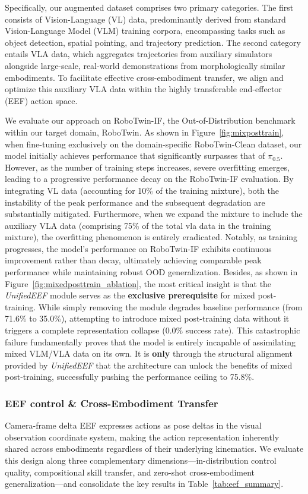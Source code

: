 Specifically, our augmented dataset comprises two primary categories. The first consists of Vision-Language (VL) data, predominantly derived from standard Vision-Language Model (VLM) training corpora, encompassing tasks such as object detection, spatial pointing, and trajectory prediction. The second category entails VLA data, which aggregates trajectories from auxiliary simulators alongside large-scale, real-world demonstrations from morphologically similar embodiments. To facilitate effective cross-embodiment transfer, we align and optimize this auxiliary VLA data within the highly transferable end-effector (EEF) action space.

We evaluate our approach on RoboTwin-IF, the Out-of-Distribution benchmark within our target domain, RoboTwin. As shown in Figure~\ref{fig:mixposttrain}, when fine-tuning exclusively on the domain-specific RoboTwin-Clean dataset, our model initially achieves performance that significantly surpasses that of $\pi_{0.5}$. However, as the number of training steps increases, severe overfitting emerges, leading to a progressive performance decay on the RoboTwin-IF evaluation. By integrating VL data (accounting for 10\% of the training mixture), both the instability of the peak performance and the subsequent degradation are substantially mitigated. Furthermore, when we expand the mixture to include the auxiliary VLA data (comprising 75\% of the total vla data in the training mixture), the overfitting phenomenon is entirely eradicated. Notably, as training progresses, the model's performance on RoboTwin-IF exhibits continuous improvement rather than decay, ultimately achieving comparable peak performance while maintaining robust OOD generalization. Besides, as shown in Figure~\ref{fig:mixedposttrain_ablation}, the most critical insight is that the \textit{UnifiedEEF} module serves as the \textbf{exclusive prerequisite} for mixed post-training. While simply removing the module degrades baseline performance (from 71.6\% to 35.0\%), attempting to introduce mixed post-training data without it triggers a complete representation collapse (0.0\% success rate). This catastrophic failure fundamentally proves that the model is entirely incapable of assimilating mixed VLM/VLA data on its own. It is \textbf{only} through the structural alignment provided by \textit{UnifiedEEF} that the architecture can unlock the benefits of mixed post-training, successfully pushing the performance ceiling to 75.8\%. 

\subsubsection{EEF control \& Cross-Embodiment Transfer}
Camera-frame delta EEF expresses actions as pose deltas in the visual observation coordinate system, making the action representation inherently shared across embodiments regardless of their underlying kinematics. We evaluate this design along three complementary dimensions---in-distribution control quality, compositional skill transfer, and zero-shot cross-embodiment generalization---and consolidate the key results in Table~\ref{tab:eef_summary}.

